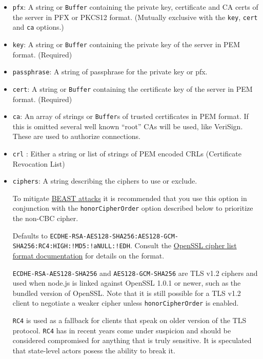 \begin{itemize}
\item
  \texttt{pfx}: A string or \texttt{Buffer} containing the private key,
  certificate and CA certs of the server in PFX or PKCS12 format.
  (Mutually exclusive with the \texttt{key}, \texttt{cert} and
  \texttt{ca} options.)
\item
  \texttt{key}: A string or \texttt{Buffer} containing the private key
  of the server in PEM format. (Required)
\item
  \texttt{passphrase}: A string of passphrase for the private key or
  pfx.
\item
  \texttt{cert}: A string or \texttt{Buffer} containing the certificate
  key of the server in PEM format. (Required)
\item
  \texttt{ca}: An array of strings or \texttt{Buffer}s of trusted
  certificates in PEM format. If this is omitted several well known
  ``root'' CAs will be used, like VeriSign. These are used to authorize
  connections.
\item
  \texttt{crl} : Either a string or list of strings of PEM encoded CRLs
  (Certificate Revocation List)
\item
  \texttt{ciphers}: A string describing the ciphers to use or exclude.

  To mitigate
  \href{http://blog.ivanristic.com/2011/10/mitigating-the-beast-attack-on-tls.html}{BEAST
  attacks} it is recommended that you use this option in conjunction
  with the \texttt{honorCipherOrder} option described below to
  prioritize the non-CBC cipher.

  Defaults to
  \texttt{ECDHE-RSA-AES128-SHA256:AES128-GCM-SHA256:RC4:HIGH:!MD5:!aNULL:!EDH}.
  Consult the
  \href{http://www.openssl.org/docs/apps/ciphers.html\#CIPHER_LIST_FORMAT}{OpenSSL
  cipher list format documentation} for details on the format.

  \texttt{ECDHE-RSA-AES128-SHA256} and \texttt{AES128-GCM-SHA256} are
  TLS v1.2 ciphers and used when node.js is linked against OpenSSL 1.0.1
  or newer, such as the bundled version of OpenSSL. Note that it is
  still possible for a TLS v1.2 client to negotiate a weaker cipher
  unless \texttt{honorCipherOrder} is enabled.

  \texttt{RC4} is used as a fallback for clients that speak on older
  version of the TLS protocol. \texttt{RC4} has in recent years come
  under suspicion and should be considered compromised for anything that
  is truly sensitive. It is speculated that state-level actors posess
  the ability to break it.


\end{itemize}
